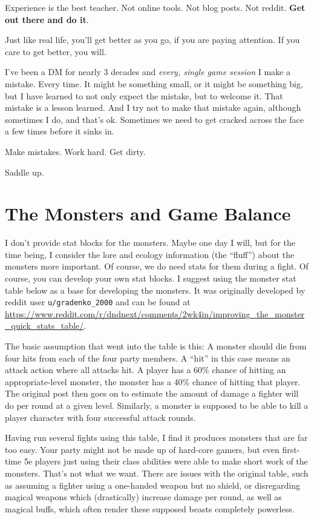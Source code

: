 Experience is the best teacher. Not online tools. Not blog posts. Not reddit. \textbf{Get out there and do it}.

Just like real life, you'll get better as you go, if you are paying attention. If you care to get better, you will.

I've been a DM for nearly 3 decades and \emph{every, single game session} I make a mistake. Every time. It might be something small, or it might be something big, but I have learned to not only expect the mistake, but to welcome it. That mistake is a lesson learned. And I try not to make that mistake again, although sometimes I do, and that's ok. Sometimes we need to get cracked across the face a few times before it sinks in.

Make mistakes. Work hard. Get dirty.

Saddle up.

\section{The Monsters and Game Balance}
I don't provide stat blocks for the monsters. Maybe one day I will, but for the time being, I consider the lore and ecology information (the ``fluff'') about the monsters more important. Of course, we do need stats for them during a fight. Of course, you can develop your own stat blocks. I suggest using the monster stat table below as a base for developing the monsters. It was originally developed by reddit user \texttt{u/gradenko\_2000} and can be found at \url{https://www.reddit.com/r/dndnext/comments/2wk4in/improving_the_monster_quick_stats_table/}.

The basic assumption that went into the table is this: A monster should die from four hits from each of the four party members. A ``hit'' in this case means an attack action where all attacks hit. A player has a 60\% chance of hitting an appropriate-level monster, the monster has a 40\% chance of hitting that player. The original post then goes on to estimate the amount of damage a fighter will do per round at a given level. Similarly, a monster is supposed to be able to kill a player character with four successful attack rounds.

Having run several fights using this table, I find it produces monsters that are far too easy. Your party might not be made up of hard-core gamers, but even first-time 5e players just using their class abilities were able to make short work of the monsters. That's not what we want. There are issues with the original table, such as assuming a fighter using a one-handed weapon but no shield, or disregarding magical weapons which (drastically) increase damage per round, as well as magical buffs, which often render these supposed beasts completely powerless.

